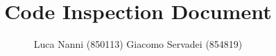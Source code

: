 \documentclass[a4paper]{article}
\begin{document}
\title{Code Inspection Document}
\author{Luca Nanni (850113) \linebreak
	Giacomo Servadei (854819)}
\maketitle
\tableofcontents




\end{document}
